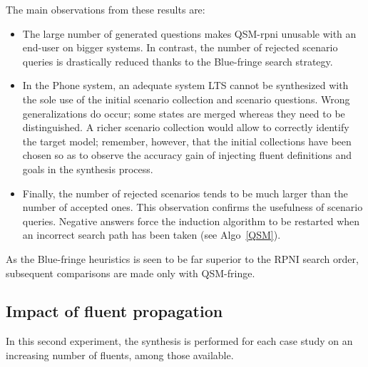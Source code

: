 The main observations from these results are:
\begin{itemize}
\item The large number of generated questions makes QSM-rpni unusable with an end-user on bigger systems. In contrast, the number of rejected scenario queries is drastically reduced thanks to the Blue-fringe search strategy. 
\item In the Phone system, an adequate system LTS cannot be synthesized with the sole use of the initial scenario collection and scenario questions. Wrong generalizations do occur; some states are merged whereas they need to be distinguished. A richer scenario collection would allow to correctly identify the target model; remember, however, that the initial collections have been chosen so as to observe the accuracy gain of injecting fluent definitions and goals in the synthesis process.
\item Finally, the number of rejected scenarios tends to be much larger than the number of accepted ones. This observation confirms the usefulness of scenario queries. Negative answers force the induction algorithm to be restarted when an incorrect search path has been taken (see Algo~\ref{QSM}).
\end{itemize}

As the Blue-fringe heuristics is seen to be far superior to the RPNI search order, subsequent comparisons are made only with QSM-fringe.


\subsection{Impact of fluent propagation}

In this second experiment, the synthesis is performed for each case study on an increasing number of fluents, among those available.


